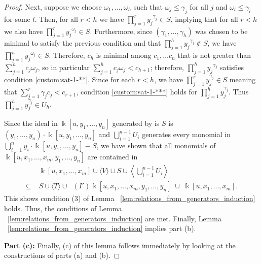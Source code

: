 \documentclass{amsart}
\theoremstyle{plain}
\theoremstyle{definition}
\theoremstyle{remark}
\numberwithin{equation}{section}
\newcommand\Bk{{\Bbbk}}
\DeclareMathOperator{\initial}{in_\prec}
\begin{document}
\begin{proof}
Next, suppose we choose $\omega_1, \ldots, \omega_h$ such that $\omega_j\le \gamma_j$ for all $j$ and $\omega_l \le \gamma_l$ for some $l$.  Then, for all $r< h$ we have $\prod_{j=1}^r {y_j}^{\gamma_j}\in S$, implying that for all $r< h$ we also have $\prod_{j=1}^r {y_j}^{\omega_j}\in S$.  Furthermore, since $(\gamma_1, \ldots, \gamma_h)$ was chosen to be minimal to satisfy the previous condition and that $\prod_{j=1}^h {y_j}^{\gamma_j}\not\in S$, we have $\prod_{j=1}^h {y_j}^{\omega_j}\in S$.  Therefore, $c_h$ is minimal among $c_1, \ldots c_n$ that is not greater than $\sum_{j=1}^h c_j \omega_j$, so in particular $\sum_{j=1}^h c_j\omega_j < c_{h+1}$; therefore, $\prod_{j=1}^h {y_j}^{\gamma_j}$ satisfies condition \ref{custom:sat-1-**}.  
Since for each $r<h$, we have $\prod_{j=1}^r y_{j}^{\gamma_j}\in S$ meaning that $\sum_{j=1}^r \gamma_j c_j < c_{r+1}$, condition \ref{custom:sat-1-***} holds for $\prod_{j=1}^h y_j^{\gamma_j}$.  
Thus $\prod_{j=1}^h y_j^{\gamma_j}\in U_{h}$.

Since the ideal in $\Bk[u, y_1, \ldots, y_n]$ generated by is $S$ is $(y_1, \ldots, y_n) \cdot \Bk[u, y_1, \ldots, y_n]$ and $\bigcup_{i=1}^{n-1} U_i$ generates every monomial in $\bigcup_{i=1}^n y_i \cdot \Bk[u, y_1, \ldots, y_n]-S$, we have shown that all monomials of $\Bk[u, x_1, \ldots, x_m, y_1, \ldots, y_n]$ are contained in
\begin{align*}
				& \Bk[u, x_1, \ldots, x_m] \cup \langle V \rangle \cup S \cup \left\langle \bigcup_{i=1}^{n-1} U_i \right\rangle \\
	\subseteq \; 	& S \cup \langle T\rangle \cup \initial(I') \Bk[u, x_1, \ldots, x_m, y_1, \ldots, y_n] \; \cup \; \Bk[u, x_1, \ldots, x_m].
\end{align*}
This shows condition (3) of Lemma ~\ref{lem:relations_from_generators_induction} holds.  Thus, the conditions of 
Lemma ~\ref{lem:relations_from_generators_induction} are met. Finally, Lemma ~\ref{lem:relations_from_generators_induction} implies part (b).

{\bf Part (c):}
Finally, (c) of this lemma follows immediately by looking at the constructions of parts (a) and (b).  







\end{proof}
\end{document}
